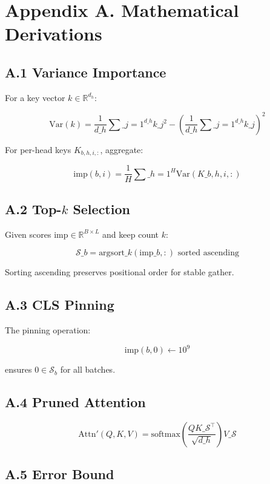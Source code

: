 
\section{Appendix A. Mathematical Derivations}

\subsection{A.1 Variance Importance}

For a key vector $k \in \mathbb{R}^{d_h}$:

\[
\text{Var}(k) = \frac{1}{d\_h} \sum\_{j=1}^{d\_h} k\_j^2 - \left(\frac{1}{d\_h} \sum\_{j=1}^{d\_h} k\_j\right)^2
\tag{A.1}
\]

For per-head keys $K_{b,h,i,:}$, aggregate:

\[
\text{imp}(b, i) = \frac{1}{H} \sum\_{h=1}^{H} \text{Var}(K\_{b,h,i,:})
\tag{A.2}
\]

\subsection{A.2 Top-$k$ Selection}

Given scores $\text{imp} \in \mathbb{R}^{B \times L}$ and keep count $k$:

\[
\mathcal{S}\_b = \text{argsort}\_{k}(\text{imp}\_{b,:}) \text{ sorted ascending}
\tag{A.3}
\]

Sorting ascending preserves positional order for stable gather.

\subsection{A.3 CLS Pinning}

The pinning operation:

\[
\text{imp}(b, 0) \leftarrow 10^9
\tag{A.4}
\]

ensures $0 \in \mathcal{S}_b$ for all batches.

\subsection{A.4 Pruned Attention}

\[
\text{Attn}'(Q, K, V) = \text{softmax}\!\left(\frac{Q K\_{\mathcal{S}}^\top}{\sqrt{d\_h}}\right)V\_{\mathcal{S}}
\tag{A.5}
\]

\subsection{A.5 Error Bound}

